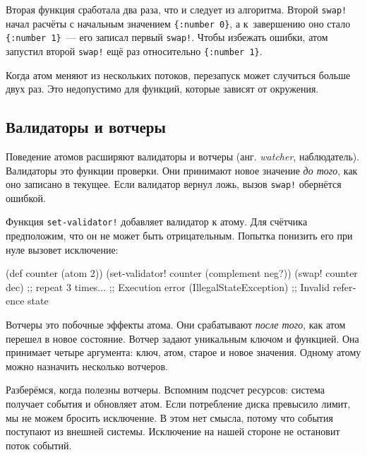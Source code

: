 Вторая функция сработала два раза, что и следует из алгоритма. Второй
\verb|swap!| начал расчёты с начальным значением \verb|{:number 0}|, а
к~завершению оно стало \verb|{:number 1}|~--- его записал первый
\verb|swap!|. Чтобы избежать ошибки, атом запустил второй \verb|swap!| ещё раз
относительно \verb|{:number 1}|.

Когда атом меняют из нескольких потоков, перезапуск может случиться больше двух
раз. Это недопустимо для функций, которые зависят от окружения.

\subsection{Валидаторы и вотчеры}


Поведение атомов расширяют валидаторы и вотчеры (анг. \emph{watcher},
наблюдатель). Валидаторы это функции проверки. Они принимают новое значение
\emph{до того}, как оно записано в текущее. Если валидатор вернул ложь, вызов
\verb|swap!| обернётся ошибкой.


Функция \verb|set-validator!| добавляет валидатор к атому. Для счётчика
предположим, что он не может быть отрицательным. Попытка понизить его при нуле
вызовет исключение:

\begin{english}
  \begin{clojure}
(def counter (atom 2))
(set-validator! counter (complement neg?))
(swap! counter dec) ;; repeat 3 times...
;; Execution error (IllegalStateException)
;; Invalid reference state
  \end{clojure}
\end{english}

Вотчеры это побочные эффекты атома. Они срабатывают \emph{после того}, как атом
перешел в новое состояние. Вотчер задают уникальным ключом и функцией. Она
принимает четыре аргумента: ключ, атом, старое и новое значения. Одному атому
можно назначить несколько вотчеров.

Разберёмся, когда полезны вотчеры. Вспомним подсчет ресурсов: система получает
события и обновляет атом. Если потребление диска превысило лимит, мы не можем
бросить исключение. В этом нет смысла, потому что события поступают из внешней
системы. Исключение на нашей стороне не остановит поток событий.


